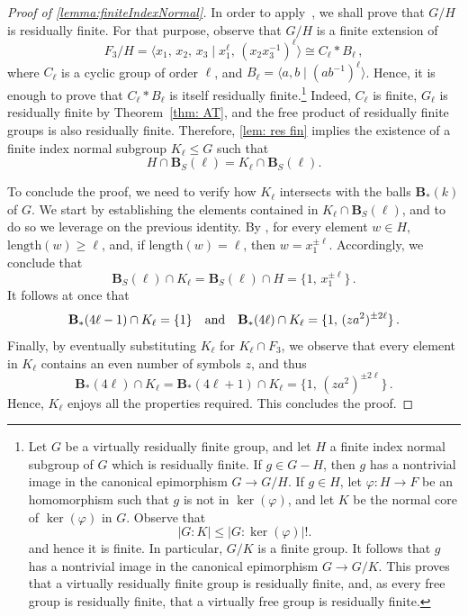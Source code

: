 \documentclass[a4paper]{amsart}
\newcommand{\len}{\mathrm{length}}
\newcommand{\B}{\mathbf{B}}
\newcommand{\0}{\mathbf{0}}
\theoremstyle{definition}
\begin{document}
\begin{proof}[Proof of \cref{lemma:finiteIndexNormal}]
   In order to apply~, we shall prove that $G/ H$ is residually finite. For that purpose, observe that $G/H$ is a finite extension of 
    \[  F_3 / H = \langle x_1, \, x_2, \, x_3 \mid x_1^\ell, \, (x_2 x_3^{-1})^\ell  \rangle \cong C_\ell \ast B_\ell  \,,\]
    where $C_\ell$ is a cyclic group of order $\ell$, and $B_\ell = \langle a, b \mid (ab^{-1})^\ell \rangle$. Hence, it is enough to prove that $C_\ell \ast B_\ell$ is itself residually finite.\footnote{Let $G$ be a virtually residually finite group, and let $H$ a finite index normal subgroup of $G$ which is residually finite. If $g \in G - H$, then $g$ has a nontrivial image in the canonical epimorphism $G \to G/H$. If $g \in H$, let $\varphi : H \to F$ be an homomorphism such that $g$ is not in $\ker(\varphi)$, and let $K$ be the normal core of $\ker(\varphi)$ in $G$. Observe that
    \[|G:K| \le |G: \ker(\varphi)| !. \]
    and hence it is finite. In particular, $G/K$ is a finite group. It follows that $g$ has a nontrivial image in the canonical epimorphism $G \to G/K$. This proves that a virtually residually finite group is residually finite, and, as every free group is residually finite, that a virtually free group is residually finite.} Indeed, $C_\ell$ is finite, $G_\ell$ is residually finite by Theorem~\ref{thm: AT}, and the free product of residually finite groups is also residually finite. Therefore, \cref{lem: res fin} implies the existence of a finite index normal subgroup $K_\ell \leq G$ such that 
    \[ H \cap \B_S(\ell) = K_\ell \cap \B_S(\ell). \]

    To conclude the proof, we need to verify how $K_\ell$ intersects with the balls $\B_\ast (k)$ of $G$.  We start by establishing the elements contained in $K_\ell \cap \B_S(\ell)$, and to do so we leverage on the previous identity. By , for every element $w \in H$, $\len(w) \geq \ell$, and, if $\len(w) = \ell$, then $w = x_1^{\pm \ell}$.  Accordingly, we conclude that
    \[ \B_S(\ell) \cap K_\ell = \B_S(\ell) \cap H = \{1,\, x_1^{\pm \ell} \} \,.\]
    It follows at once that
    \[ \B_\ast(4\ell-1) \cap K_\ell = \{ 1 \} \quad \hbox{and} \quad \B_\ast(4\ell) \cap K_\ell = \{ 1, \, (za^2)^{\pm 2\ell} \} \,.\]
    Finally, by eventually substituting $K_\ell$ for $K_\ell \cap F_3$, we observe that every element in $K_\ell$ contains an even number of symbols $z$, and thus
    \[ \B_\ast(4\ell) \cap K_\ell = \B_\ast(4\ell+1) \cap K_\ell = \{ 1, \, (za^2)^{\pm 2\ell} \} \,.\]
    Hence, $K_\ell$ enjoys all the properties required. This concludes the proof. 
\end{proof}
\end{document}
